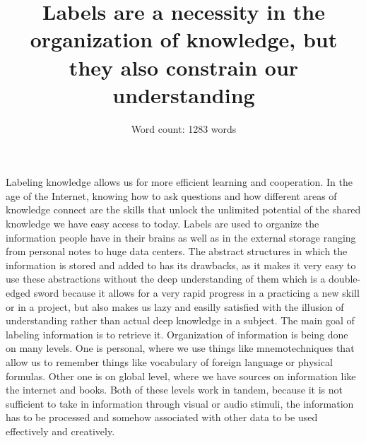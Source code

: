\documentclass{report}
\title{Labels are a necessity in the organization of knowledge, but they also constrain our understanding}
\author{Word count: 1283 words}
\begin{document}
\maketitle
\newpage

Labeling knowledge allows us for more efficient learning and cooperation. In the age of the Internet, knowing how to ask questions and
how different areas of knowledge connect are the skills that unlock the unlimited potential of the shared knowledge we have easy access
to today. Labels are used to organize the information people have in their brains as well as in the external storage ranging from personal
notes to huge data centers. The abstract structures in which the information is stored and added to has its drawbacks, as it makes it
very easy to use these abstractions without the deep understanding of them which is a double-edged sword because it allows for a very 
rapid progress in a practicing a new skill or in a project, but also makes us lazy and easilly satisfied with the illusion of 
understanding rather than actual deep knowledge in a subject. The main goal of labeling information is to retrieve it. 
Organization of information is being done on many levels. One is personal, where
we use things like mnemotechniques that allow us to remember things like vocabulary of foreign language or physical formulas. 
Other one is on global level, where we have sources on information like the internet and books. Both of these levels work in tandem, 
because it is not sufficient to take in information through visual or audio stimuli, the information has to be processed and somehow
associated with other data to be used effectively and creatively.\\
\end{document}
